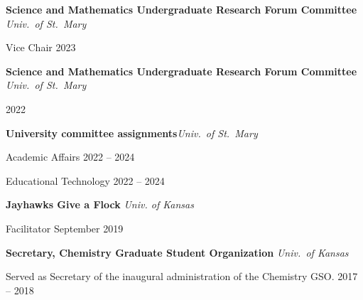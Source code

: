 {\bf Science and Mathematics Undergraduate Research Forum Committee} \hfill \textit{Univ.\ of St.\ Mary}

Vice Chair \hfill 2023 %
\vspace{\y}

{\bf Science and Mathematics Undergraduate Research Forum Committee} \hfill \textit{Univ.\ of St.\ Mary}

\hfill 2022
\vspace{\y}

\textbf{University committee assignments}\hfill\textit{Univ.\ of St.\ Mary}

Academic Affairs \hfill 2022 -- 2024

Educational Technology \hfill 2022 -- 2024

\vspace{\y}
{\bf Jayhawks Give a Flock} \hfill \textit{Univ. of Kansas}

Facilitator \hfill September 2019

%

\vspace{\y}
{\bf Secretary, Chemistry Graduate Student Organization} \hfill \textit{Univ.\ of Kansas}

Served as Secretary of the inaugural administration of the Chemistry GSO. \hfill 2017 -- 2018
%
